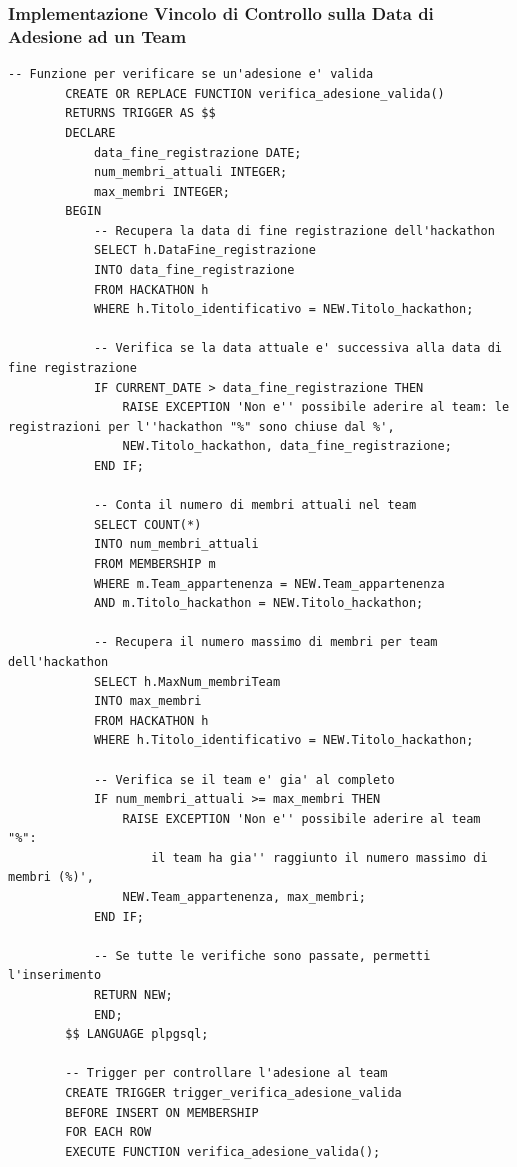 \documentclass[a4paper, 10pt]{article}
\begin{document}
	\subsubsection{Implementazione Vincolo di Controllo sulla Data di Adesione ad un Team}
	\begin{lstlisting}[style=sqlstyle]
		-- Funzione per verificare se un'adesione e' valida
		CREATE OR REPLACE FUNCTION verifica_adesione_valida()
		RETURNS TRIGGER AS $$
		DECLARE
			data_fine_registrazione DATE;
			num_membri_attuali INTEGER;
			max_membri INTEGER;
		BEGIN
			-- Recupera la data di fine registrazione dell'hackathon
			SELECT h.DataFine_registrazione
			INTO data_fine_registrazione
			FROM HACKATHON h
			WHERE h.Titolo_identificativo = NEW.Titolo_hackathon;
			
			-- Verifica se la data attuale e' successiva alla data di fine registrazione
			IF CURRENT_DATE > data_fine_registrazione THEN
				RAISE EXCEPTION 'Non e'' possibile aderire al team: le registrazioni per l''hackathon "%" sono chiuse dal %', 
				NEW.Titolo_hackathon, data_fine_registrazione;
			END IF;
			
			-- Conta il numero di membri attuali nel team
			SELECT COUNT(*)
			INTO num_membri_attuali
			FROM MEMBERSHIP m
			WHERE m.Team_appartenenza = NEW.Team_appartenenza
			AND m.Titolo_hackathon = NEW.Titolo_hackathon;
			
			-- Recupera il numero massimo di membri per team dell'hackathon
			SELECT h.MaxNum_membriTeam
			INTO max_membri
			FROM HACKATHON h
			WHERE h.Titolo_identificativo = NEW.Titolo_hackathon;
			
			-- Verifica se il team e' gia' al completo
			IF num_membri_attuali >= max_membri THEN
				RAISE EXCEPTION 'Non e'' possibile aderire al team "%": 
					il team ha gia'' raggiunto il numero massimo di membri (%)', 
				NEW.Team_appartenenza, max_membri;
			END IF;
			
			-- Se tutte le verifiche sono passate, permetti l'inserimento
			RETURN NEW;
			END;
		$$ LANGUAGE plpgsql;
		
		-- Trigger per controllare l'adesione al team
		CREATE TRIGGER trigger_verifica_adesione_valida
		BEFORE INSERT ON MEMBERSHIP
		FOR EACH ROW
		EXECUTE FUNCTION verifica_adesione_valida();
	\end{lstlisting}
\end{document}
